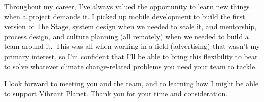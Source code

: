 Throughout my career, I've always valued the opportunity to learn new things when a project demands it.
I picked up mobile development to build the first version of The Stage, system design when we needed to scale it,
and mentorship, process design, and culture planning (all remotely) when we needed to build a team around it.
This was all when working in a field (advertising) that wasn't my primary interest,
so I'm confident that I'll be able to bring this flexibility to bear to solve whatever climate change-related problems
you need your team to tackle.

I look forward to meeting you and the team, and to learning how I might be able to support Vibrant Planet.
Thank you for your time and consideration.


\vspace{10pt}

\makeletterclosing


